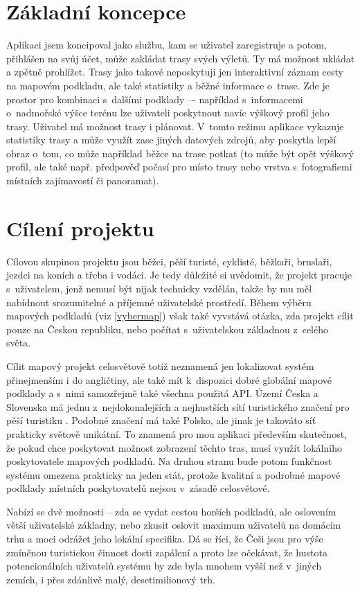 \section{Základní koncepce}
Aplikaci jsem koncipoval jako službu, kam se uživatel zaregistruje a
potom, přihlášen na svůj účet, může zakládat trasy svých výletů. Ty má
možnost ukládat a zpětně prohlížet. Trasy jako takové neposkytují jen
interaktivní záznam cesty na mapovém podkladu, ale také statistiky a
běžné informace o~trase. Zde je prostor pro kombinaci s~dalšími
podklady –- například s~informacemi o~nadmořské výšce terénu lze
uživateli poskytnout navíc výškový profil jeho trasy. Uživatel má
možnost trasy i plánovat. V~tomto režimu aplikace vykazuje statistiky
trasy a může využít zase jiných datových zdrojů, aby poskytla lepší
obraz o~tom, co může například běžce na trase potkat (to může být
opět výškový profil, ale také např. předpověď počasí pro místo trasy
nebo vrstva s~fotografiemi místních zajímavostí či panoramat).

\section{Cílení projektu}
Cílovou skupinou projektu jsou běžci, pěší turisté, cyklisté,
běžkaři, bruslaři, jezdci na koních a třeba i vodáci. Je tedy
důležité si uvědomit, že projekt pracuje s~uživatelem, jenž nemusí
být nijak technicky vzdělán, takže by mu měl nabídnout srozumitelné a
příjemné uživatelské prostředí. Během výběru mapových podkladů (viz
\ref{vybermap}) však také vyvstává otázka, zda projekt cílit pouze na
Českou republiku, nebo počítat s~uživatelskou základnou z~celého světa.

Cílit mapový projekt celosvětově totiž neznamená jen lokalizovat
systém přinej\-menším i do angličtiny, ale také mít k~dispozici dobré
globální mapové podklady a s~nimi samozřejmě také všechna použitá
API. Území Česka a Slovenska má jednu z~nej\-dokonalejších a nej\-hustších
sítí turistického značení pro pěší turistiku \cite{kct}.
Podobné značení má také Polsko, ale jinak je takováto síť prakticky světově unikátní. To
znamená pro mou aplikaci především skutečnost, že pokud chce
poskytovat možnost zobrazení těchto tras, musí využít lokálního
poskytovatele mapových podkladů. Na druhou stranu bude potom
funkčnost systému omezena prakticky na jeden stát, protože kvalitní a
podrobné mapové podklady místních poskytovatelů nejsou v~zásadě
celosvětové.

Nabízí se dvě možnosti -- zda se vydat cestou horších podkladů, ale
oslovením větší uživatelské základny, nebo zkusit oslovit maximum
uživatelů na domácím trhu a moci odrážet jeho lokální specifika. Dá se
říci, že Češi jsou pro výše zmíněnou turistickou činnost dosti
zapálení \cite{turistika} a proto lze očekávat, že hustota
potencionálních uživatelů systému by zde byla mnohem vyšší než
v~jiných zemích, i přes zdánlivě malý, desetimilionový trh.

